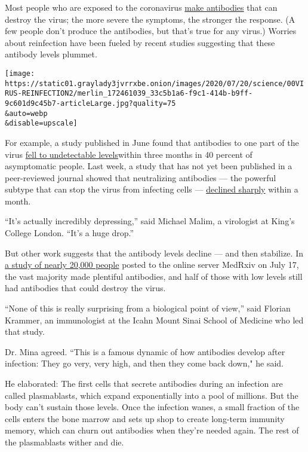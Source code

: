 Most people who are exposed to the coronavirus
\href{https://www.nytimes3xbfgragh.onion/2020/05/07/health/coronavirus-antibody-prevalence.html}{make
antibodies} that can destroy the virus; the more severe the symptoms,
the stronger the response. (A few people don't produce the antibodies,
but that's true for any virus.) Worries about reinfection have been
fueled by recent studies suggesting that these antibody levels plummet.

\texttt{[image: https://static01.graylady3jvrrxbe.onion/images/2020/07/20/science/00VIRUS-REINFECTION2/merlin\_172461039\_33c5b1a6-f9c1-414b-b9ff-9c601d9c45b7-articleLarge.jpg?quality=75\\\&auto=webp\\\&disable=upscale]}

For example, a study published in June found that antibodies to one part
of the virus
\href{https://www.nytimes3xbfgragh.onion/2020/06/18/health/coronavirus-antibodies.html}{fell
to undetectable levels}within three months in 40 percent of asymptomatic
people. Last week, a study that has not yet been published in a
peer-reviewed journal showed that neutralizing antibodies --- the
powerful subtype that can stop the virus from infecting cells ---
\href{https://www.medrxiv.org/content/10.1101/2020.07.09.20148429v1}{declined
sharply} within a month.

``It's actually incredibly depressing,'' said Michael Malim, a
virologist at King's College London. ``It's a huge drop.''

But other work suggests that the antibody levels decline --- and then
stabilize. In
\href{https://www.medrxiv.org/content/10.1101/2020.07.14.20151126v1}{a
study of nearly 20,000 people} posted to the online server MedRxiv on
July 17, the vast majority made plentiful antibodies, and half of those
with low levels still had antibodies that could destroy the virus.

``None of this is really surprising from a biological point of view,''
said Florian Krammer, an immunologist at the Icahn Mount Sinai School of
Medicine who led that study.

Dr. Mina agreed. ``This is a famous dynamic of how antibodies develop
after infection: They go very, very high, and then they come back down,"
he said.

He elaborated: The first cells that secrete antibodies during an
infection are called plasmablasts, which expand exponentially into a
pool of millions. But the body can't sustain those levels. Once the
infection wanes, a small fraction of the cells enters the bone marrow
and sets up shop to create long-term immunity memory, which can churn
out antibodies when they're needed again. The rest of the plasmablasts
wither and die.

